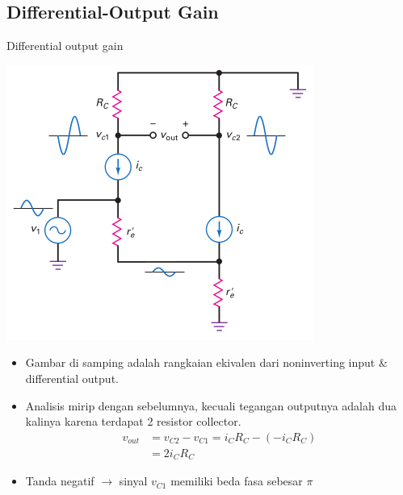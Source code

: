 \documentclass[aspectratio=169]{beamer}
\begin{document}
\subsection{Differential-Output Gain}
\begin{frame}{Differential output gain}
	\begin{multicols}{2}
		\begin{center}
			\includegraphics[height=0.7\textheight]{gambar/01.diff-amp/01.noninverting_input_and_differential_output}
		\end{center}
		\columnbreak
		\begin{itemize}
			\item Gambar di samping adalah rangkaian ekivalen dari noninverting input \& differential output.
			\item Analisis mirip dengan sebelumnya, kecuali tegangan outputnya adalah dua kalinya karena terdapat 2 resistor collector.
			\begin{align*}
				v_{out} &= v_{C2} - v_{C1} = i_C R_C - (-i_C R_C) \\
				&= 2 i_C R_C
			\end{align*}
			\item Tanda negatif $ \rightarrow $ sinyal $ v_{C1} $ memiliki beda fasa sebesar $ \pi $
		\end{itemize}
	\end{multicols}
\end{frame}
\end{document}
